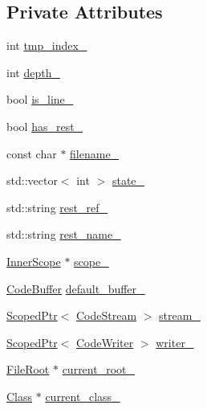 \subsection*{Private Attributes}
\begin{DoxyCompactItemize}
\item 
int \hyperlink{classmocha_1_1_codegen_visitor_a4e2e4c70cc264ee5357386facf4a8342}{tmp\_\-index\_\-}
\item 
int \hyperlink{classmocha_1_1_codegen_visitor_addd36abf7937731e4890f02aee09f35c}{depth\_\-}
\item 
bool \hyperlink{classmocha_1_1_codegen_visitor_af198dc9fecc2e79d9a3d3df0a3e28231}{is\_\-line\_\-}
\item 
bool \hyperlink{classmocha_1_1_codegen_visitor_a2ee0634fdb95ee4150e914a69d894257}{has\_\-rest\_\-}
\item 
const char $\ast$ \hyperlink{classmocha_1_1_codegen_visitor_aab8ca0550a471810ff7caa360fbd26b4}{filename\_\-}
\item 
std::vector$<$ int $>$ \hyperlink{classmocha_1_1_codegen_visitor_a021c80b5dabd79be55bdc0d0cde292c0}{state\_\-}
\item 
std::string \hyperlink{classmocha_1_1_codegen_visitor_a54eb17d7aaa77efc93f704f35056a4a0}{rest\_\-ref\_\-}
\item 
std::string \hyperlink{classmocha_1_1_codegen_visitor_a9e6cd1c236038c7bf885481added42e5}{rest\_\-name\_\-}
\item 
\hyperlink{classmocha_1_1_inner_scope}{InnerScope} $\ast$ \hyperlink{classmocha_1_1_codegen_visitor_a0a7ecec309937be191ab716c144a3475}{scope\_\-}
\item 
\hyperlink{classmocha_1_1_code_buffer}{CodeBuffer} \hyperlink{classmocha_1_1_codegen_visitor_a7570febb0ccff0a7c6895031d8e4f124}{default\_\-buffer\_\-}
\item 
\hyperlink{classmocha_1_1_scoped_ptr}{ScopedPtr}$<$ \hyperlink{classmocha_1_1_code_stream}{CodeStream} $>$ \hyperlink{classmocha_1_1_codegen_visitor_a357d3e1fd1b56f1af4242c9f5af22602}{stream\_\-}
\item 
\hyperlink{classmocha_1_1_scoped_ptr}{ScopedPtr}$<$ \hyperlink{classmocha_1_1_code_writer}{CodeWriter} $>$ \hyperlink{classmocha_1_1_codegen_visitor_ad497faaa804159b3beecec28583a10fb}{writer\_\-}
\item 
\hyperlink{classmocha_1_1_file_root}{FileRoot} $\ast$ \hyperlink{classmocha_1_1_codegen_visitor_abfc91c7744f53a5727356dab84d55647}{current\_\-root\_\-}
\item 
\hyperlink{classmocha_1_1_class}{Class} $\ast$ \hyperlink{classmocha_1_1_codegen_visitor_ac72ee4104a6d4aaaaa2b0695bae62f07}{current\_\-class\_\-}
\end{DoxyCompactItemize}



